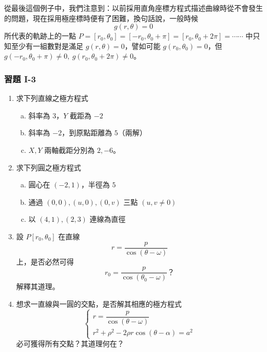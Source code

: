 從最後這個例子中，我們注意到：以前採用直角座標方程式描述曲線時從不會發生的問題，現在採用極座標時便有了困難，換句話說，一般時候
\[
  g(r, \theta) = 0
\]
所代表的軌跡上的一點 $P = [r_0, \theta_0] = [-r_0, \theta_0 + \pi] = [r_0, \theta_0 + 2\pi] = \cdots\cdots$ 中只知至少有一組數對是滿足 $g(r, \theta) = 0$，譬如可能 $g(r_0, \theta_0) = 0$，但 $g(-r_0, \theta_0 + \pi) \neq 0, \ g(r_0, \theta_0 + 2\pi) \neq 0$。

\subsubsection*{習題 I-3}\label{sec:b5s-ex1-3}

\begin{enumerate}[1.]
  \item 求下列直線之極方程式
  \begin{enumerate}[(a)]
    \item 斜率為 $3$，$Y$ 截距為 $-2$
    \item 斜率為 $-2$，到原點距離為 $5$（兩解）
    \item $X, Y$ 兩軸截距分別為 $2, -6$。
  \end{enumerate}

  \item 求下列圓之極方程式
  \begin{enumerate}[(a)]
    \item 圓心在 $(-2, 1)$，半徑為 $5$
    \item 通過 $(0, 0), (u, 0), (0, v)$ 三點 $(u, v \neq 0)$
    \item 以 $(4, 1), (2, 3)$ 連線為直徑
  \end{enumerate}

  \item 設 $P[r_0, \theta_0]$ 在直線
  \[
    r = \frac{p}{\cos(\theta - \omega)}
  \]
  上，是否必然可得
  \[
    r_0 = \frac{p}{\cos(\theta_0 - \omega)}\text{？}
  \]
  解釋其道理。

  \item 想求一直線與一圓的交點，是否解其相應的極方程式
  \[
    \begin{cases}
      r = \dfrac{p}{\cos(\theta - \omega)} \\[8pt]
      r^2 + \rho^2 - 2\rho r\cos(\theta - \alpha) = a^2
    \end{cases}
  \]
  必可獲得所有交點？其道理何在？


\end{enumerate}
